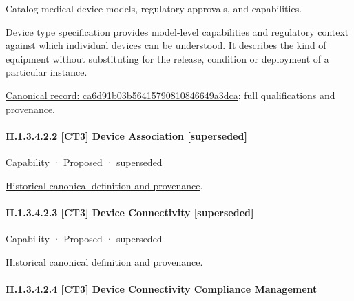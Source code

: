 Catalog medical device models, regulatory approvals, and capabilities.



Device type specification provides model-level capabilities and regulatory context against which individual devices can be understood. It describes the kind of equipment without substituting for the release, condition or deployment of a particular instance.


{\footnotesize \href{../../../../../../../continuum/strategy/capability/feature/ca6d91b03b56415790810846649a3dca.md}{Canonical record: ca6d91b03b56415790810846649a3dca}; full qualifications and provenance.}\par
\paragraph*{II.1.3.4.2.2 [CT3] Device Association [superseded]}
\label{navigation:II.1.3.4.2.2}

\label{element:902daf2ce9714876bbfee52eef1a7ab0}
{\small Capability · Proposed · superseded}\par
\href{../../../../../../../continuum/strategy/capability/902daf2ce9714876bbfee52eef1a7ab0.md}{Historical canonical definition and provenance}.\par
\paragraph*{II.1.3.4.2.3 [CT3] Device Connectivity [superseded]}
\label{navigation:II.1.3.4.2.3}

\label{element:658d4b6770a943bcb5801fb7ca9b47be}
{\small Capability · Proposed · superseded}\par
\href{../../../../../../../continuum/strategy/capability/658d4b6770a943bcb5801fb7ca9b47be.md}{Historical canonical definition and provenance}.\par
\paragraph*{II.1.3.4.2.4 [CT3] Device Connectivity Compliance Management}
\label{navigation:II.1.3.4.2.4}

